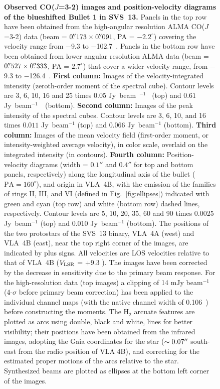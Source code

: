 \documentclass[12pt]{mythesis}
\begin{document}
\begin{figure}[p!]
\begin{center}
\caption[Figure 1 name]{
{\bf Observed CO($J$=3-2) images and position-velocity diagrams of the blueshifted Bullet 1 in SVS~13.}
{Panels in the top row have been obtained from the high-angular resolution ALMA CO($J$=3-2) data (beam = $0\mbox{$.\!\!^{\prime\prime}$}173 \times 0\mbox{$.\!\!^{\prime\prime}$}091$, PA = $-2.2^\circ$) covering the velocity range from $-$9.3 to $-$102.7~\kms. Panels in the bottom row have been obtained from lower angular resolution ALMA data (beam = $0\mbox{$.\!\!^{\prime\prime}$}527 \times 0\mbox{$.\!\!^{\prime\prime}$}333$, PA = $2.7^\circ$) that cover a wider velocity range, from $-$9.3 to $-$126.4~\kms. {\bf First column:} Images of the velocity-integrated intensity (zeroth-order moment of the spectral cube). Contour levels are 3, 6, 10, 16 and 25 times $0.05$ Jy~beam~$^{-1}$ \kms\ (top) and $0.61$ Jy~beam$^{-1}$~\kms\ (bottom). {\bf Second column:} Images of the peak intensity of the spectral cubes. Contour levels are 3, 6, 10, and 16 times $0.011$ Jy~beam$^{-1}$ (top) and $0.066$ Jy~beam$^{-1}$ (bottom).  {\bf Third column:} Images of the mean velocity field (first-order moment, or intensity-weighted average velocity), in color scale, overlaid on the integrated intensity (in contours).  {\bf Fourth column:} Position-velocity diagrams (width = $0.1''$ and $0.4''$ for top and bottom panels, respectively) along the longitudinal axis of the bullet ($\mathrm{PA}=160^\circ$), and origin in VLA~4B, with the emission of the families of rings II, III, and VI (defined in Fig.~\ref{fig:ellipses}) indicated with green and cyan (top row) and white (bottom row) dashed lines, respectively. Contour levels are 5, 10, 20, 35, 60 and 90 times 
 0.0025 Jy~beam$^{-1}$ (top) and 0.010 Jy~beam$^{-1}$ (bottom).
The positions of the two protostars of the SVS~13 binary, VLA~4A (west) and VLA~4B (east), near the top right corner of the images, are indicated by plus signs. 
All velocities are LOS velocities relative to that of VLA~4B ($V_{\rm LSR}$ = +9.3 \kms). The images have been corrected by the decrease in sensitivity due to the primary beam response. For the high-resolution data (top images) a clipping of 14 mJy beam$^{-1}$ (4-$\sigma$ before primary beam correction) has been applied to the individual channel maps (with the native channel width of 0.106~\kms) before constructing the moments. 
The H$_2$ arcuate features are plotted as arcs using double, black and white, lines for better visibility; their positions have been obtained from the infrared images, adopting the Gaia coordinates for the star ($\sim 0.07\mbox{$^{\prime\prime}$}$ south-east from the radio position of VLA 4B), and correcting for the estimated proper motions of the arcs relative to the star.
Synthesized beams are plotted as ellipses at the bottom left corner of the images.
 \label{fig:mom}}}%
\end{center}
 \end{figure}
\end{document}
